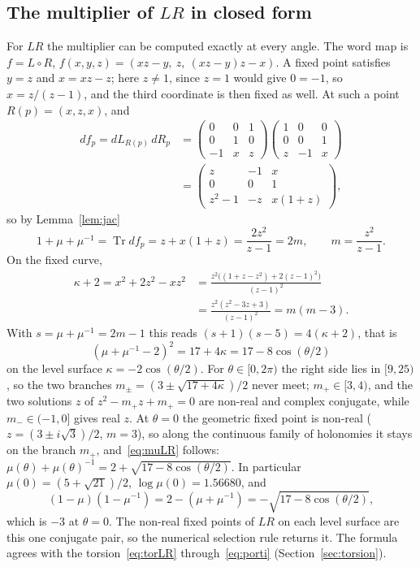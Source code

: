 \documentclass[11pt]{amsart}
\theoremstyle{definition}
\theoremstyle{remark}
\newcommand{\Tr}{\operatorname{Tr}}
\begin{document}
\subsection{The multiplier of $LR$ in closed form}
For $LR$ the multiplier can be computed exactly at every angle. The word map is
$f = L\circ R$, $f(x,y,z) = (xz - y,\ z,\ (xz-y)z - x)$. A fixed point satisfies
$y = z$ and $x = xz - z$; here $z \ne 1$, since $z = 1$ would give $0 = -1$, so
$x = z/(z-1)$, and the third coordinate is then fixed as well. At such a point
$R(p) = (x, z, x)$, and
\begin{align*}
df_p = dL_{R(p)}\, dR_p
&= \begin{pmatrix} 0&0&1\\0&1&0\\-1&x&z\end{pmatrix}
\begin{pmatrix} 1&0&0\\0&0&1\\z&-1&x\end{pmatrix}\\
&= \begin{pmatrix} z&-1&x\\0&0&1\\z^2-1&-z&x(1+z)\end{pmatrix},
\end{align*}
so by Lemma~\ref{lem:jac}
\[
1 + \mu + \mu^{-1} = \Tr df_p = z + x(1+z) = \frac{2z^2}{z-1} = 2m,
\qquad m = \frac{z^2}{z-1}.
\]
On the fixed curve,
\begin{align*}
\kappa + 2 = x^2 + 2z^2 - xz^2
&= \frac{z^2\big((1+z-z^2) + 2(z-1)^2\big)}{(z-1)^2}\\
&= \frac{z^2(z^2-3z+3)}{(z-1)^2} = m(m-3).
\end{align*}
With $s = \mu + \mu^{-1} = 2m - 1$ this reads $(s+1)(s-5) = 4(\kappa+2)$, that is
\[
(\mu + \mu^{-1} - 2)^2 = 17 + 4\kappa = 17 - 8\cos(\theta/2)
\]
on the level surface $\kappa = -2\cos(\theta/2)$. For $\theta \in [0, 2\pi)$ the right
side lies in $[9, 25)$, so the two branches $m_\pm = (3 \pm \sqrt{17+4\kappa})/2$
never meet; $m_+ \in [3, 4)$, and the two solutions $z$ of $z^2 - m_+ z + m_+ = 0$ are
non-real and complex conjugate, while $m_- \in (-1, 0]$ gives real $z$. At $\theta = 0$
the geometric fixed point is non-real ($z = (3 \pm i\sqrt3)/2$, $m = 3$), so along the
continuous family of holonomies it stays on the branch $m_+$, and~\eqref{eq:muLR}
follows: $\mu(\theta) + \mu(\theta)^{-1} = 2 + \sqrt{17 - 8\cos(\theta/2)}$. In
particular $\mu(0) = (5+\sqrt{21})/2$, $\log\mu(0) = 1.56680$, and
\[
(1-\mu)(1-\mu^{-1}) = 2 - (\mu+\mu^{-1}) = -\sqrt{17 - 8\cos(\theta/2)},
\]
which is $-3$ at $\theta = 0$. The non-real fixed points of $LR$ on each level surface
are this one conjugate pair, so the numerical selection rule returns it. The formula
agrees with the torsion~\eqref{eq:torLR} through~\eqref{eq:porti}
(Section~\ref{sec:torsion}).
\end{document}
